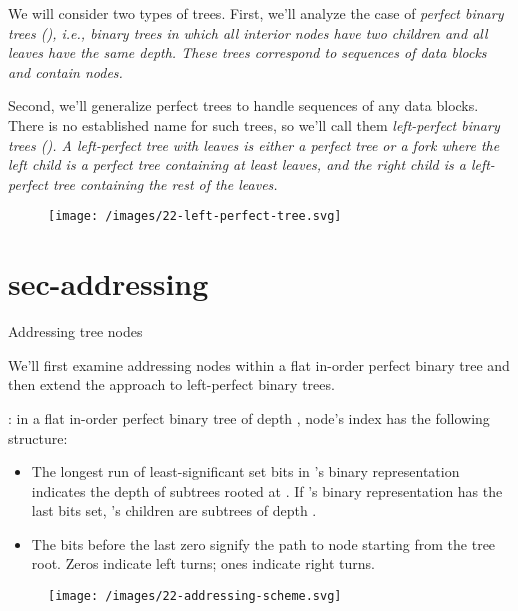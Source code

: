 \documentclass{article}
\begin{document}
We will consider two types of trees.
First, we'll analyze the case of \em{perfect binary trees} (), i.e., binary trees in which all interior nodes have two children and all leaves have the same depth.
These trees correspond to sequences of  data blocks and contain  nodes.

Second, we'll generalize perfect trees to handle sequences of any  data blocks.
There is no established name for such trees, so we'll call them \em{left-perfect binary trees} ().
A left-perfect tree with  leaves is either a perfect tree or a fork where the left child is a perfect tree containing at least  leaves, and the right child is a left-perfect tree containing the rest of the leaves.

\begin{figure}[grayscale-diagram,medium-size]
  \texttt{[image: /images/22-left-perfect-tree.svg]}
\end{figure}

\section{sec-addressing}{Addressing tree nodes}

We'll first examine addressing nodes within a flat in-order perfect binary tree and then extend the approach to left-perfect binary trees.

: in a flat in-order perfect binary tree of depth , node's index  has the following structure:
\begin{itemize}
    \item
    The longest run of least-significant set bits in 's binary representation indicates the depth of subtrees rooted at .
    If 's binary representation has the last  bits set, 's children are subtrees of depth .
    \item
    The bits before the last zero signify the path to node  starting from the tree root.
    Zeros indicate left turns; ones indicate right turns.
\end{itemize}

\begin{figure}[grayscale-diagram,medium-size]
  \texttt{[image: /images/22-addressing-scheme.svg]}
\end{figure}
\end{document}
